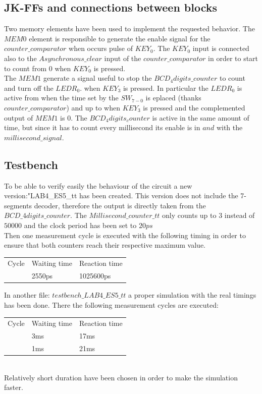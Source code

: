 \documentclass[12pt]{article}
\begin{document}
\subsection{JK-FFs and connections between blocks}
Two memory elements have been used to implement the requested behavior. 
The $MEM0$ element is responsible to generate the enable signal for the $counter\_comparator$ when occurs pulse of $KEY_0$. The $KEY_0$ input is connected also to the $Asynchronous\_clear$ input of the $counter\_comparator$ in order to start to count from $0$ when $KEY_0$ is pressed.
\\The $MEM1$ generate a signal useful to stop the $BCD_4digits\_counter$ to count and turn off the $LEDR_0$. when $KEY_3$ is pressed. In particular the $LEDR_0$ is active from when the time set by the $SW_{7-0}$ is eplaced (thanks $counter\_comparator$) and up to when $KEY_3$ is pressed and the complemented output of $MEM1$ is $0$. The $BCD_4digits_counter$ is active in the same amount of time, but since it has to count every millisecond its enable is in $and$ with the $millisecond\_signal$.
\subsection{Testbench}
To be able to verify easily the behaviour of the circuit a new version:"LAB4\_ES5\_tt has been created. This version does not include the 7-segments decoder, therefore the output is directly taken from the $BCD\_4digits\_counter$. The $Millisecond\_counter\_tt$ only counts up to $3$ instead of $50000$ and the clock period has been set to $20ps$\\
Then one measurement cycle is executed with the following timing  in order to ensure that both counters reach their respective maximum value.

	\begin{tabular}{lll}
	Cycle & Waiting time & Reaction time \\
	& 2550ps          & 1025600ps                  
\end{tabular}


In another file: $testbench\_LAB4\_ES5\_tt$ a proper simulation with the real timings has been done. There the following measurement cycles are executed:

	\begin{tabular}{lll}
		Cycle & Waiting time & Reaction time \\
		& 3ms          & 17ms          \\
		& 1ms          & 21ms         
	\end{tabular}
\\

Relatively short duration have been chosen in order to make the simulation faster.
\end{document}
